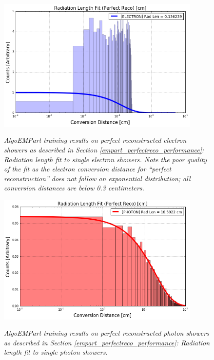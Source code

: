 \begin{figure}[ht!]
\centering
\includegraphics[width=0.9\textwidth]{Figures/EMPartTraining/mc_trained/RadLength_Selected_e.png}\\
\caption{\textit{AlgoEMPart training results on perfect reconstructed electron showers as described in Section \ref{empart_perfectreco_performance}: Radiation length fit to single electron showers. Note the poor quality of the fit as the electron conversion distance for ``perfect reconstruction'' does not follow an exponential distribution; all conversion distances are below 0.3 centimeters.}}
\label{empart_perfectreco_performance_fig6}
\end{figure}

\begin{figure}[ht!]
\centering
\includegraphics[width=0.9\textwidth]{Figures/EMPartTraining/mc_trained/RadLength_Selected_g.png}\\
\caption{\textit{AlgoEMPart training results on perfect reconstructed photon showers as described in Section \ref{empart_perfectreco_performance}: Radiation length fit to single photon showers.}}
\label{empart_perfectreco_performance_fig7}
\end{figure}


